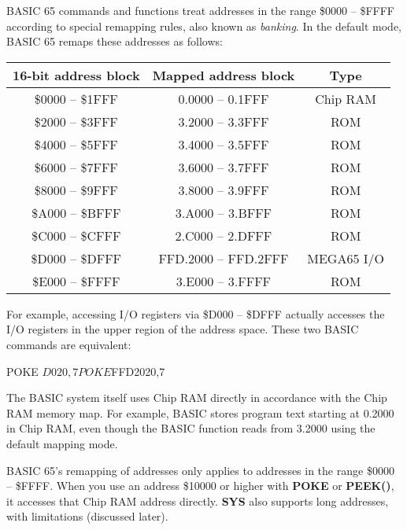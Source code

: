\newpage

BASIC 65 commands and functions treat addresses in the range \$0000 -- \$FFFF
according to special remapping rules, also known as {\em banking}. In the
default mode, BASIC 65 remaps these addresses as follows:

\begin{center}
\begin{tabular}{|c|c|c|}
\hline
{\bf 16-bit address block} & {\bf Mapped address block} & {\bf Type} \\
\hline
\$0000 -- \$1FFF & 0.0000 -- 0.1FFF & Chip RAM \\
\hline
\$2000 -- \$3FFF & 3.2000 -- 3.3FFF & ROM \\
\hline
\$4000 -- \$5FFF & 3.4000 -- 3.5FFF & ROM \\
\hline
\$6000 -- \$7FFF & 3.6000 -- 3.7FFF & ROM \\
\hline
\$8000 -- \$9FFF & 3.8000 -- 3.9FFF & ROM \\
\hline
\$A000 -- \$BFFF & 3.A000 -- 3.BFFF & ROM \\
\hline
\$C000 -- \$CFFF & 2.C000 -- 2.DFFF & ROM \\
\hline
\$D000 -- \$DFFF & FFD.2000 -- FFD.2FFF & MEGA65 I/O\\
\hline
\$E000 -- \$FFFF & 3.E000 -- 3.FFFF & ROM \\
\hline
\end{tabular}
\end{center}

For example, accessing I/O registers via \$D000 -- \$DFFF actually accesses
the I/O registers in the upper region of the address space. These two BASIC
commands are equivalent:

\begin{screenoutput}
POKE $D020,7

POKE $FFD2020,7
\end{screenoutput}

The BASIC system itself uses Chip RAM directly in accordance with the Chip RAM
memory map. For example, BASIC stores program text starting at 0.2000 in Chip
RAM, even though the BASIC function  reads from 3.2000 using
the default mapping mode.

BASIC 65's remapping of addresses only applies to addresses in the range \$0000
-- \$FFFF. When you use an address \$10000 or higher with {\bf POKE} or
{\bf PEEK()}, it accesses that Chip RAM address directly. {\bf SYS} also
supports long addresses, with limitations (discussed later).

